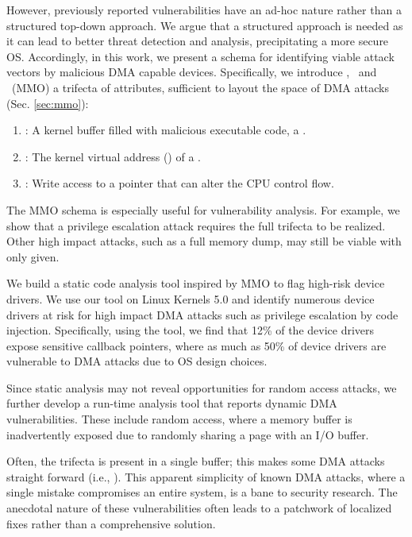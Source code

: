 However, previously reported vulnerabilities have an ad-hoc nature \cite{thunder,MMT16,Ben17b} rather than a structured top-down approach. We argue that a structured approach is needed as it can lead to better threat detection and analysis, precipitating a more secure OS. Accordingly, in this work, we present a schema for identifying viable attack vectors by malicious DMA capable devices. Specifically, we introduce \means,~\motivation{} and \oportunity~(MMO) a trifecta of attributes, sufficient to layout the space of DMA attacks (Sec. \ref{sec:mmo}):
\begin{enumerate}
    \item \motivation: A kernel buffer filled with malicious executable code, a \mabaf.
    \item \means: The kernel virtual address (\kva) of a \mabaf.
    \item \oportunity: Write access to a pointer that can alter the CPU control flow.
\end{enumerate} 

The MMO schema is especially useful for vulnerability analysis. For example, we show that a privilege escalation attack requires the full trifecta to be realized. Other high impact attacks, such as a full memory dump, may still be viable with only \oportunity{} given. 

We build a static code analysis tool inspired by MMO to flag high-risk device drivers. We use our tool on Linux Kernels 5.0 and identify numerous device drivers at risk for high impact DMA attacks such as privilege escalation by code injection. Specifically, using the tool, we find that 12\% of the device drivers expose sensitive callback pointers, where as much as 50\% of device drivers are vulnerable to DMA attacks due to OS design choices.

Since static analysis may not reveal opportunities for random access attacks, we further develop a run-time analysis tool that reports dynamic DMA vulnerabilities. These include random access, where a memory buffer is inadvertently exposed due to randomly sharing a page with an I/O buffer.


Often, the trifecta is present in a single buffer; this makes some DMA attacks straight forward (i.e., \simple{}). This apparent simplicity of known DMA attacks, where a single mistake compromises an entire system, is a bane to security research. The anecdotal nature of these vulnerabilities often leads to a patchwork of localized fixes rather than a comprehensive solution. 

